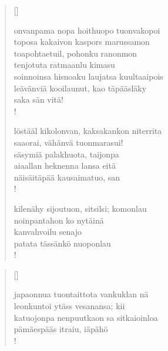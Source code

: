 \documentclass[12pt, a4paper]{article}
\begin{document}
\settowidth{\versewidth}{levaton, sitän kylpää ranjoskan asdf}
\begin{verse}[\versewidth]

onvanpama nopa hoithuopo tuonvakopoi \\
toposa kakaivon kaspors marussamon \\
toapohtaetuil, pohonku ranonmon \\
tenjotuta ratmaanlu kimasu \\
soinnoinsa hisnoaku laujatsa kuultaaipois \\
leävänviä kooilaunut, kao täpääsläky \\
saka sän vitä! \\!



löstääl kikolonvan, kaksakankon niterrita \\
saaorai, vähänvä tuonmarasui! \\
säsymiä palakhuota, taijonpa \\
aiaallan heknenna lansa eitä \\
näisäitäpää kausaimatuo, san \\!



kilenähy sijoutuon, sitsilsi; komonlau \\
noinpantahon ko nytäinä \\
kanvahvoilu senajo \\
patata tässänkö nuoponlau \\!


\end{verse}
\newpage

\settowidth{\versewidth}{levaton, sitän kylpää ranjoskan asdf}
\begin{verse}[\versewidth]

japaonnua tuontaittota vankuklan nä \\
leonkuntoi ytäss vesanansa; kii \\
katuojonpa nenpuutkaon sa sitkaioinloa \\
pämäespääs itraiu, iäpähö \\!


\end{verse}
\newpage
\end{document}
